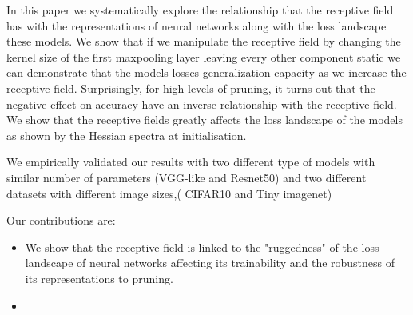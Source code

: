 In this paper we systematically explore the relationship that the receptive field has with the representations of neural networks
along with the loss landscape these models. We show that if we manipulate the receptive field by changing the kernel
size of the first maxpooling layer leaving every other component static we can demonstrate that the models losses
generalization capacity as we increase the receptive field. Surprisingly, for high levels of pruning, it turns out
that the negative effect on accuracy have an inverse relationship with the receptive field. We show that the
receptive fields greatly affects the loss landscape of the models as shown by the Hessian spectra at initialisation.

We empirically validated our results with two different type of models  with similar number of parameters (VGG-like and
Resnet50) and two different datasets with different image sizes,( CIFAR10 and Tiny imagenet)

Our contributions are:
\begin{itemize}
  \item We show that the receptive field is linked to the "ruggedness" of the loss landscape of neural networks
    affecting its trainability and the robustness of its representations to pruning.
  \item
\end{itemize}


